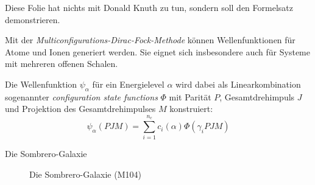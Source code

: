 \documentclass[aspectratio=32]{beamer}
\begin{document}
\begin{frame}
	Diese Folie hat nichts mit Donald Knuth zu tun, sondern soll den Formelsatz demonstrieren.
	\par
	Mit der \textit{Multiconfigurations-Dirac-Fock-Methode} können Wellenfunktionen für Atome und Ionen generiert werden. Sie eignet sich insbesondere auch für Systeme mit mehreren offenen Schalen. \par
	
	Die Wellenfunktion $\psi_{\alpha}$ für ein Energielevel $\alpha$ wird dabei als Linearkombination sogenannter \textit{configuration state functions} $\Phi$ mit Parität $P$, Gesamtdrehimpuls $J$ und Projektion des Gesamtdrehimpulses $M$ konstruiert:
	\[
	\psi_{\alpha}(PJM)=\sum_{i=1}^{n_{c}}c_i(\alpha)\Phi(\gamma_iPJM)
	\]
\end{frame}

\begin{frame}{Die Sombrero-Galaxie}
	\begin{figure}
	\centering
	\caption{Die Sombrero-Galaxie (M104)}
		
	\end{figure}
\end{frame}
\end{document}
